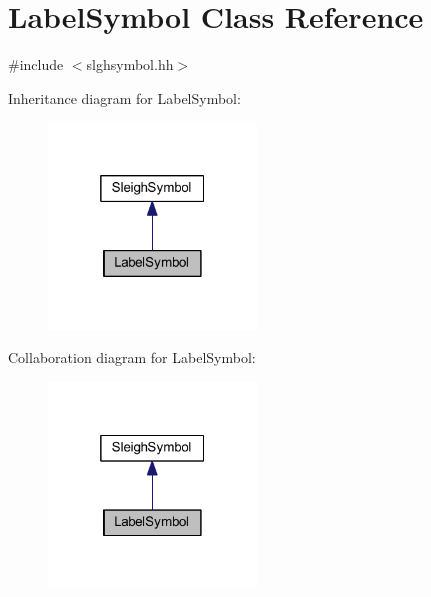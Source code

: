 \hypertarget{class_label_symbol}{}\section{Label\+Symbol Class Reference}
\label{class_label_symbol}


{\ttfamily \#include $<$slghsymbol.\+hh$>$}



Inheritance diagram for Label\+Symbol\+:
\nopagebreak
\begin{figure}[H]
\begin{center}
\leavevmode
\includegraphics[width=157pt]{class_label_symbol__inherit__graph}
\end{center}
\end{figure}


Collaboration diagram for Label\+Symbol\+:
\nopagebreak
\begin{figure}[H]
\begin{center}
\leavevmode
\includegraphics[width=157pt]{class_label_symbol__coll__graph}
\end{center}
\end{figure}
